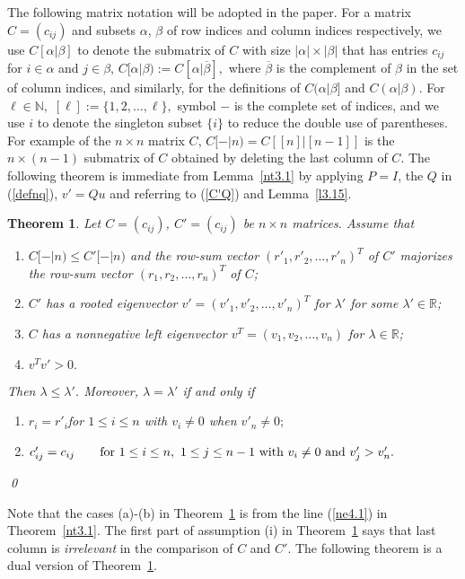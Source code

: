 \documentclass[final,3p, times, 12pt]{elsarticle}
\theoremstyle{plain}
\newtheorem{thm}{Theorem}[section]
\theoremstyle{definition}
\theoremstyle{remark}
\numberwithin{equation}{section}
\begin{document}
The following matrix notation will be adopted in the paper. For a matrix $C=(c_{ij})$ and subsets $\alpha$, $\beta$ of row indices and column indices respectively, we use $C[\alpha|\beta]$ to denote the submatrix
of $C$ with size $|\alpha|\times |\beta|$ that has entries $c_{ij}$ for $i\in \alpha$ and $j\in\beta$,
$C[\alpha|\beta):=C[\alpha|\overline{\beta}],$ where $\overline{\beta}$ is the complement of $\beta$ in the set of column indices, and
similarly, for the definitions of $C(\alpha|\beta]$ and $C(\alpha|\beta).$
 For $\ell\in \mathbb{N},$ $[\ell]:=\{1, 2, \ldots, \ell\},$ symbol $-$ is the complete set of indices, and we use  $i$ to denote the singleton subset $\{i\}$ to reduce the double use of parentheses. For example of the $n\times n$ matrix $C$,
 $C[-|n)=C[[n]|[n-1]]$ is the $n\times (n-1)$ submatrix of $C$ obtained by deleting the last column of $C$.
The following theorem is immediate from Lemma~\ref{nt3.1} by applying $P=I$, the $Q$ in (\ref{defnq}), $v'=Qu$ and referring to (\ref{C'Q}) and Lemma~\ref{l3.15}.


\begin{thm}\label{t3.1}
 Let $C=(c_{ij})$, $C'=(c_{ij})$ be  $n\times n$ matrices.
Assume that
\begin{enumerate}
\item[(i)]   $C[-|n)\leq C'[-|n)$ and the row-sum vector $(r'_1, r'_2, \ldots, r'_n)^T$ of $C'$ majorizes the row-sum vector  $(r_1, r_2, \ldots, r_n)^T$ of $C$;
\item[(ii)]  $C'$ has a rooted eigenvector $v'=(v'_1, v'_2, \ldots, v'_n)^T$ for $\lambda'$ for some  $\lambda'\in \mathbb{R}$;
\item[(iii)] $C$ has a nonnegative left eigenvector $v^T=(v_1, v_2, \ldots, v_n)$ for $\lambda\in \mathbb{R}$;
\item[(iv)] $v^Tv'>0.$
\end{enumerate}
 Then $\lambda\leq \lambda'$.
Moreover, $\lambda=\lambda'$
if and only if
\begin{enumerate}
\item[(a)] $r_i=r'_i$\qquad for $1\leq i\leq n$ with $v_i\not=0$ when $v'_n\not=0;$
\item[(b)]
$c'_{ij}=c_{ij}\qquad \hbox{for~}1\leq i\leq n,~1\leq j\leq n-1 \hbox{~with~} v_i\ne 0 \hbox{~and~} v'_j> v'_n.$
\end{enumerate} \qed
\end{thm}

Note that the cases (a)-(b) in Theorem~\ref{t3.1} is from the line (\ref{ne4.1}) in Theorem~\ref{nt3.1}.
The first part of assumption (i) in Theorem~\ref{t3.1}  says that last column is {\it irrelevant} in the comparison of $C$ and $C'$. The following theorem is a dual version of Theorem~\ref{t3.1}.
\end{document}
